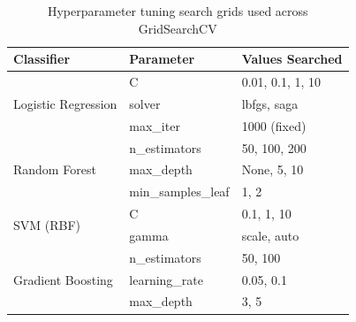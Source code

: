 \vspace{0.8cm}

\begin{table}[!p]
\small
\centering
\caption{Hyperparameter tuning search grids used across GridSearchCV}
\label{tab:hyperparameter-grid}
\begin{tabular}{lll}
\toprule
\textbf{Classifier} & \textbf{Parameter} & \textbf{Values Searched} \\
\midrule
\multirow{3}{*}{Logistic Regression} & C & 0.01, 0.1, 1, 10 \\
& solver & lbfgs, saga \\
& max\_iter & 1000 (fixed) \\
\midrule
\multirow{3}{*}{Random Forest} & n\_estimators & 50, 100, 200 \\
& max\_depth & None, 5, 10 \\
& min\_samples\_leaf & 1, 2 \\
\midrule
\multirow{2}{*}{SVM (RBF)} & C & 0.1, 1, 10 \\
& gamma & scale, auto \\
\midrule
\multirow{3}{*}{Gradient Boosting} & n\_estimators & 50, 100 \\
& learning\_rate & 0.05, 0.1 \\
& max\_depth & 3, 5 \\
\bottomrule
\end{tabular}
\end{table}
